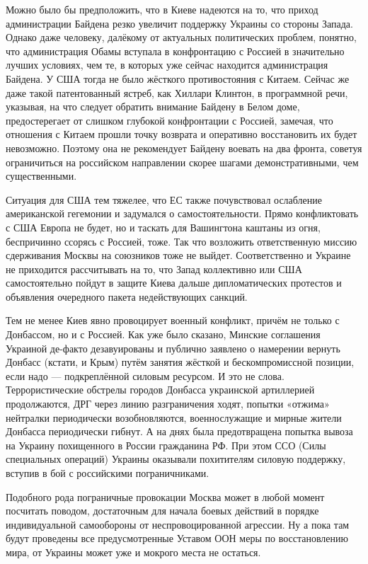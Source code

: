 Можно было бы предположить, что в Киеве надеются на то, что приход
администрации Байдена резко увеличит поддержку Украины со стороны Запада.
Однако даже человеку, далёкому от актуальных политических проблем, понятно, что
администрация Обамы вступала в конфронтацию с Россией в значительно лучших
условиях, чем те, в которых уже сейчас находится администрация Байдена. У США
тогда не было жёсткого противостояния с Китаем. Сейчас же даже такой
патентованный ястреб, как Хиллари Клинтон, в программной речи, указывая, на что
следует обратить внимание Байдену в Белом доме, предостерегает от слишком
глубокой конфронтации с Россией, замечая, что отношения с Китаем прошли точку
возврата и оперативно восстановить их будет невозможно. Поэтому она не
рекомендует Байдену воевать на два фронта, советуя ограничиться на российском
направлении скорее шагами демонстративными, чем существенными.


Ситуация для США тем тяжелее, что ЕС также почувствовал ослабление американской
гегемонии и задумался о самостоятельности. Прямо конфликтовать с США Европа не
будет, но и таскать для Вашингтона каштаны из огня, беспричинно ссорясь с
Россией, тоже. Так что возложить ответственную миссию сдерживания Москвы на
союзников тоже не выйдет. Соответственно и Украине не приходится рассчитывать
на то, что Запад коллективно или США самостоятельно пойдут в защите Киева
дальше дипломатических протестов и объявления очередного пакета недействующих
санкций.

Тем не менее Киев явно провоцирует военный конфликт, причём не только с
Донбассом, но и с Россией. Как уже было сказано, Минские соглашения Украиной
де-факто дезавуированы и публично заявлено о намерении вернуть Донбасс (кстати,
и Крым) путём занятия жёсткой и бескомпромиссной позиции, если надо —
подкреплённой силовым ресурсом. И это не слова. Террористические обстрелы
городов Донбасса украинской артиллерией продолжаются, ДРГ через линию
разграничения ходят, попытки «отжима» нейтралки периодически возобновляются,
военнослужащие и мирные жители Донбасса периодически гибнут. А на днях была
предотвращена попытка вывоза на Украину похищенного в России гражданина РФ. При
этом ССО (Силы специальных операций) Украины оказывали похитителям силовую
поддержку, вступив в бой с российскими пограничниками.

Подобного рода пограничные провокации Москва может в любой момент посчитать
поводом, достаточным для начала боевых действий в порядке индивидуальной
самообороны от неспровоцированной агрессии. Ну а пока там будут проведены все
предусмотренные Уставом ООН меры по восстановлению мира, от Украины может уже и
мокрого места не остаться.

